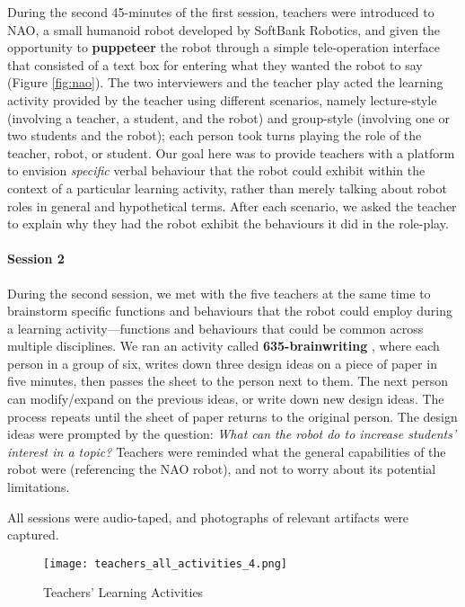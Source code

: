 During the second 45-minutes of the first session, teachers were introduced to NAO, a small humanoid robot developed by SoftBank Robotics, and given the opportunity to \textbf{puppeteer} the robot through a simple tele-operation interface that consisted of a text box for entering what they wanted the robot to say (Figure \ref{fig:nao}). The two interviewers and the teacher play acted the learning activity provided by the teacher using different scenarios, namely lecture-style (involving a teacher, a student, and the robot) and group-style (involving one or two students and the robot); each person took turns playing the role of the teacher, robot, or student.  Our goal here was to provide teachers with a platform to envision {\it specific} verbal behaviour that the robot could exhibit within the context of a particular learning activity, rather than merely talking about robot roles in general and hypothetical terms. After each scenario, we asked the teacher to explain why they had the robot exhibit the behaviours it did in the role-play.

\paragraph{Session 2} During the second session, we met with the five teachers at the same time to brainstorm specific functions and behaviours that the robot could employ during a learning activity---functions and behaviours that could be common across multiple disciplines.  We ran an activity called \textbf{635-brainwriting} \cite{rhorbach1969kreative}, where each person in a group of six, writes down three design ideas on a piece of paper in five minutes, then passes the sheet to the person next to them. The next person can modify/expand on the previous ideas, or write down new design ideas.  The process repeats until the sheet of paper returns to the original person. The design ideas were prompted by the question: \textit{What can the robot do to increase students’ interest in a topic?} Teachers were reminded what the general capabilities of the robot were (referencing the NAO robot), and not to worry about its potential limitations. 

All sessions were audio-taped, and photographs of relevant artifacts were captured.


\begin{figure*}[t!]
    \centering
    \texttt{[image: teachers\_all\_activities\_4.png]}
    \caption{Teachers' Learning Activities}
    \label{fig:all_activities_2}
\end{figure*}



